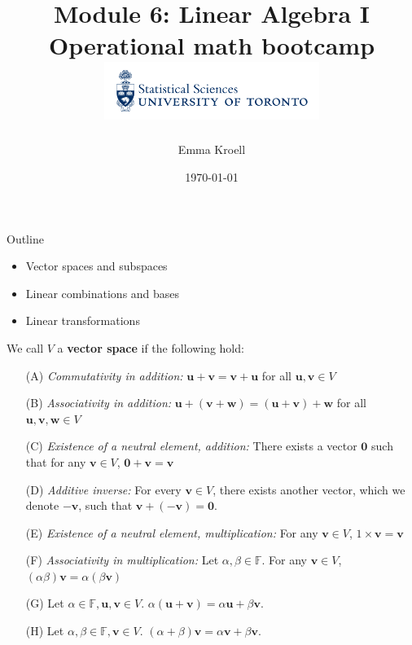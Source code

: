 \documentclass [aspectratio=169]{beamer}
\title[]{Module 6: Linear Algebra I \\ {\large Operational math bootcamp}\\ \includegraphics[width=7cm]{dept_logo.png}\vspace{-1em}}
\author[]{Emma Kroell}
\institute[]{University of Toronto}
\date{\today}
\newcommand{\bu}{{\mathbf{u}}}
\newcommand{\bv}{{\mathbf{v}}}
\newcommand{\bw}{{\mathbf{w}}}
\newcommand{\zerovec}{{\mathbf{0}}}
\begin{document}
{
\begin{frame}
    \titlepage
\end{frame}
}

\begin{frame}{Outline}
    \begin{itemize}
    	\item Vector spaces and subspaces
	\item Linear combinations and bases
	\item Linear transformations
    \end{itemize}
\end{frame}

\begin{frame}
\begin{definition}
We call $V$ a \textbf{vector space} if the following hold: \\

\begin{enumerate}
\setlength\itemsep{0.1em}
    \item[(A)] \textit{Commutativity in addition:} $\bu + \bv = \bv + \bu$ for all $\bu, \bv \in V$
    \item[(B)] \textit{Associativity in addition:} $\bu + (\bv + \bw) = (\bu + \bv) + \bw$ for all $\bu, \bv, \bw \in V$
    \item[(C)] \textit{Existence of a neutral element, addition:} There exists a vector $\zerovec$ such that for any $\bv \in V$, $\zerovec + \bv = \bv$
    \item[(D)] \textit{Additive inverse:} For every $\bv \in V$, there exists another vector, which we denote $-\bv$, such that $\bv + (-\bv) = \zerovec$.
\end{enumerate}


\begin{enumerate}
\setlength\itemsep{0.1em}
    \item[(E)] \textit{Existence of a neutral element, multiplication:} For any $\bv \in V$, $1\times \bv = \bv$
    \item[(F)] \textit{Associativity in multiplication:} Let $\alpha, \beta \in \mathbb{F}$. For any $\bv \in V$, $(\alpha \beta) \bv = \alpha (\beta \bv)$ 
\end{enumerate}

\begin{enumerate}
\setlength\itemsep{0.1em}
    \item[(G)] Let $\alpha \in \mathbb{F}, \bu, \bv \in V$. $\alpha (\bu + \bv) = \alpha \bu + \beta \bv$.
    \item[(H)] Let $\alpha, \beta \in \mathbb{F}, \bv \in V$. $(\alpha + \beta) \bv = \alpha \bv + \beta \bv$.
\end{enumerate}
\end{definition}

\end{frame}
\end{document}

